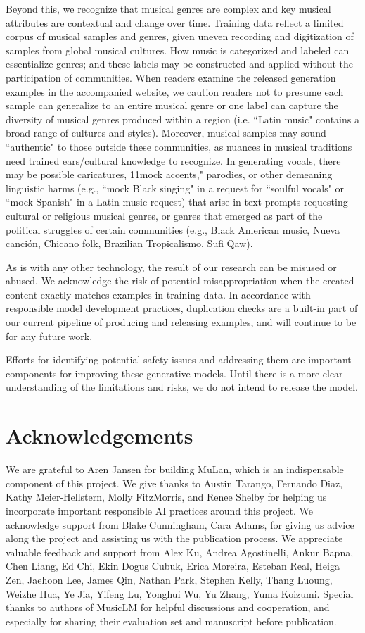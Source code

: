 \documentclass[nohyperref]{article}
\theoremstyle{plain}
\theoremstyle{definition}
\theoremstyle{remark}
\begin{document}
Beyond this, we recognize that musical genres are complex and key musical attributes are contextual and change over time. Training data reflect a limited corpus of musical samples and genres, given uneven recording and digitization of samples from global musical cultures. How music is categorized and labeled can essentialize genres; and these labels may be constructed and applied without the participation of communities. 
When readers examine the released generation examples in the accompanied website, we caution readers not to presume each sample can generalize to an entire musical genre or one label can capture the diversity of musical genres produced within a region (i.e. ``Latin music" contains a broad range of cultures and styles). Moreover, musical samples may sound ``authentic" to those outside these communities, as nuances in musical traditions need trained ears/cultural knowledge to recognize. In generating vocals, there may be possible caricatures, 11mock accents," parodies, or other demeaning linguistic harms (e.g., ``mock Black singing" in a request for ``soulful vocals" or ``mock Spanish" in a Latin music request) that arise in text prompts requesting cultural or religious musical genres, or genres that emerged as part of the political struggles of certain communities (e.g., Black American music, Nueva canci\'on, Chicano folk, Brazilian Tropicalismo, Sufi Qaw).

As is with any other technology, the result of our research can be misused or abused. We acknowledge the risk of potential misappropriation when the created content exactly matches examples in training data. In accordance with responsible model development practices, duplication checks are a built-in part of our current pipeline of producing and releasing examples, and will continue to be for any future work.

Efforts for identifying potential safety issues and addressing them are important components for improving these generative models. Until there is a more clear understanding of the limitations and risks, we do not intend to release the model.

\section*{Acknowledgements}
We are grateful to Aren Jansen for building MuLan, which is an indispensable component of this project. We give thanks to Austin Tarango, Fernando Diaz, Kathy Meier-Hellstern, Molly FitzMorris, and Renee Shelby for helping us incorporate important responsible AI practices around this project. We acknowledge support from Blake Cunningham, Cara Adams, for giving us advice along the project and assisting us with the publication process. We appreciate valuable feedback and support from Alex Ku, Andrea Agostinelli, Ankur Bapna, Chen Liang, Ed Chi, Ekin Dogus Cubuk, Erica Moreira, Esteban Real, Heiga Zen, Jaehoon Lee, James Qin, Nathan Park, Stephen Kelly, Thang Luoung, Weizhe Hua, Ye Jia, Yifeng Lu, Yonghui Wu, Yu Zhang, Yuma Koizumi. Special thanks to authors of MusicLM for helpful discussions and cooperation, and especially for sharing their evaluation set and manuscript before publication.
\end{document}
